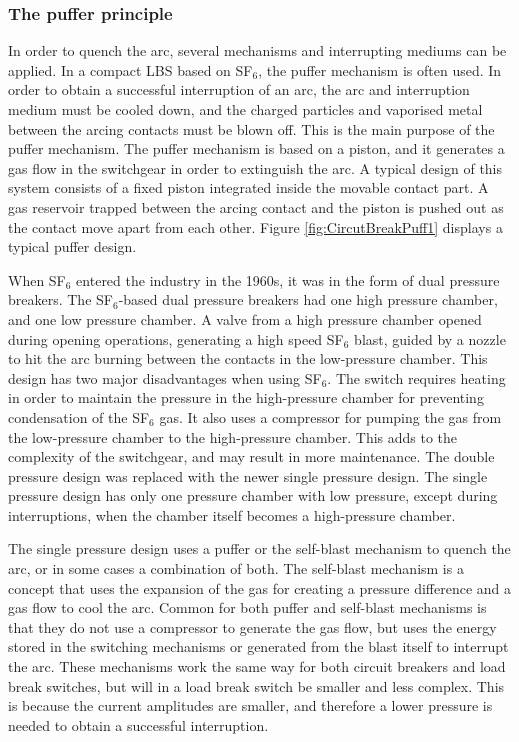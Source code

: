 \documentclass[10pt,b5paper,twoside]{article}
\begin{document}
\subsubsection{The puffer principle} \label{sec:puffer}
In order to quench the arc, several mechanisms and interrupting mediums can be applied. In a compact LBS based on SF$_6$, the puffer mechanism is often used. In order to obtain a successful interruption of an arc, the arc and interruption medium must be cooled down, and the charged particles and vaporised metal between the arcing contacts must be blown off. This is the main purpose of the puffer mechanism. The puffer mechanism is based on a piston, and it generates a gas flow in the switchgear in order to extinguish the arc. A typical design of this system consists of a fixed piston integrated inside the movable contact part. A gas reservoir trapped between the arcing contact and the piston is pushed out as the contact move apart from each other. Figure \ref{fig:CircutBreakPuff1} displays a typical puffer design.

When SF$_6$ entered the industry in the 1960s, it was in the form of dual pressure breakers. The SF$_6$-based dual pressure breakers had one high pressure chamber, and one low pressure chamber. A valve from a high pressure chamber opened during opening operations, generating a high speed SF$_6$ blast, guided by a nozzle to hit the arc burning between the contacts in the low-pressure chamber. This design has two major disadvantages when using SF$_6$. The switch requires heating in order to maintain the pressure in the high-pressure chamber for preventing condensation of the SF$_6$ gas. It also uses a compressor for pumping the gas from the low-pressure chamber to the high-pressure chamber. This adds to the complexity of the switchgear, and may result in more maintenance. The double pressure design was replaced with the newer single pressure design. The single pressure design has only one pressure chamber with low pressure, except during interruptions, when the chamber itself becomes a high-pressure chamber.

The single pressure design uses a puffer or the self-blast mechanism to quench the arc, or in some cases a combination of both. The self-blast mechanism is a concept that uses the expansion of the gas for creating a pressure difference and a gas flow to cool the arc. Common for both puffer and self-blast mechanisms is that they do not use a compressor to generate the gas flow, but uses the energy stored in the switching mechanisms or generated from the blast itself to interrupt the arc. These mechanisms work the same way for both circuit breakers and load break switches, but will in a load break switch be smaller and less complex. This is because the current amplitudes are smaller, and therefore a lower pressure is needed to obtain a successful interruption.
\end{document}
